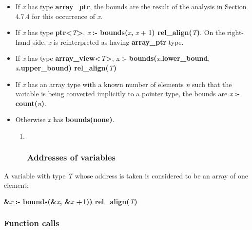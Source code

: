 \documentclass[]{article}
\begin{document}
\begin{itemize}
\item
  If \emph{x} has type \textbf{array\_ptr}, the bounds are the result of
  the analysis in Section 4.7.4 for this occurrence of \emph{x}.
\item
  If \emph{x} has type
  \textbf{ptr\textless{}}\emph{T}\textbf{\textgreater{}}, \emph{x}
  \textbf{:- bounds(}\emph{x}\textbf{,} \emph{x} + 1\textbf{)
  rel\_align(}\emph{T}\textbf{)}. On the right-hand side, \emph{x} is
  reinterpreted as having \textbf{array\_ptr} type.
\item
  If \emph{x} has type
  \textbf{array\_view\textless{}}\emph{T}\textbf{\textgreater{}}, x
  \textbf{:-} \textbf{bounds(}\emph{x}\textbf{.lower\_bound},
  \emph{x}\textbf{.upper\_bound) rel\_align(}\emph{T}\textbf{) }
\item
  If \emph{x} has an array type with a known number of elements \emph{n}
  such that the variable is being converted implicitly to a pointer
  type, the bounds are \emph{x} \textbf{:-}
  \textbf{count(}\emph{n}\textbf{)}.
\item
  Otherwise \emph{x} has \textbf{bounds(none)}.

  \begin{enumerate}
  \def\labelenumi{\arabic{enumi}.}
  \item ~
    \subsubsection{\texorpdfstring{\protect\hypertarget{ux5fToc435434951}{}{\protect\hypertarget{ux5fToc437460777}{}{\protect\hypertarget{ux5fToc440445456}{}{\protect\hypertarget{ux5fToc440449238}{}{\protect\hypertarget{ux5fToc440551888}{}{}}}}}Addresses
    of variables}{Addresses of variables}}\label{addresses-of-variables}
  \end{enumerate}
\end{itemize}

A variable with type \emph{T} whose address is taken is considered to be
an array of one element:

\textbf{\&}\emph{x} \textbf{:- bounds(\&}\emph{x}\textbf{, \&}\emph{x}
\textbf{+1)) rel\_align(}\emph{T}\textbf{)}

\subsubsection{\texorpdfstring{\protect\hypertarget{ux5fToc435434952}{}{\protect\hypertarget{ux5fToc437460778}{}{\protect\hypertarget{ux5fToc440445457}{}{\protect\hypertarget{ux5fToc440449239}{}{\protect\hypertarget{ux5fToc440551889}{}{}}}}}Function
calls}{Function calls}}\label{function-calls}
\end{document}
